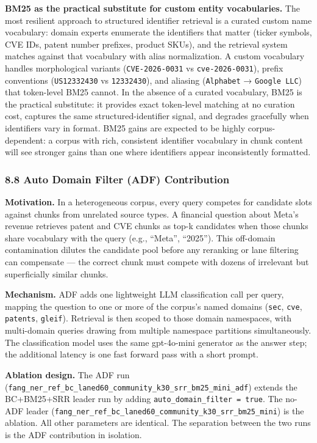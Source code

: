 \textbf{BM25 as the practical substitute for custom entity vocabularies.} The most resilient approach to structured identifier retrieval is a curated custom name vocabulary: domain experts enumerate the identifiers that matter (ticker symbols, CVE IDs, patent number prefixes, product SKUs), and the retrieval system matches against that vocabulary with alias normalization. A custom vocabulary handles morphological variants (\texttt{CVE-2026-0031} vs \texttt{cve-2026-0031}), prefix conventions (\texttt{US12332430} vs \texttt{12332430}), and aliasing (\texttt{Alphabet} → \texttt{Google\ LLC}) that token-level BM25 cannot. In the absence of a curated vocabulary, BM25 is the practical substitute: it provides exact token-level matching at no curation cost, captures the same structured-identifier signal, and degrades gracefully when identifiers vary in format. BM25 gains are expected to be highly corpus-dependent: a corpus with rich, consistent identifier vocabulary in chunk content will see stronger gains than one where identifiers appear inconsistently formatted.

\subsubsection{8.8 Auto Domain Filter (ADF) Contribution}\label{auto-domain-filter-adf-contribution}

\textbf{Motivation.} In a heterogeneous corpus, every query competes for candidate slots against chunks from unrelated source types. A financial question about Meta's revenue retrieves patent and CVE chunks as top-k candidates when those chunks share vocabulary with the query (e.g., ``Meta'', ``2025''). This off-domain contamination dilutes the candidate pool before any reranking or lane filtering can compensate --- the correct chunk must compete with dozens of irrelevant but superficially similar chunks.

\textbf{Mechanism.} ADF adds one lightweight LLM classification call per query, mapping the question to one or more of the corpus's named domains (\texttt{sec}, \texttt{cve}, \texttt{patents}, \texttt{gleif}). Retrieval is then scoped to those domain namespaces, with multi-domain queries drawing from multiple namespace partitions simultaneously. The classification model uses the same gpt-4o-mini generator as the answer step; the additional latency is one fast forward pass with a short prompt.

\textbf{Ablation design.} The ADF run (\texttt{fang\_ner\_ref\_bc\_laned60\_community\_k30\_srr\_bm25\_mini\_adf}) extends the BC+BM25+SRR leader run by adding \texttt{auto\_domain\_filter\ =\ true}. The no-ADF leader (\texttt{fang\_ner\_ref\_bc\_laned60\_community\_k30\_srr\_bm25\_mini}) is the ablation. All other parameters are identical. The separation between the two runs is the ADF contribution in isolation.

